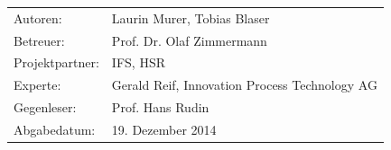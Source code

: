 \begin{titlepage}
	\vspace{80pt}	
	
	\begin{minipage}[b]{0.4\textwidth}
		\begin{flushleft}
			\begin{tabular}{ll}  
				Autoren: & Laurin Murer, Tobias Blaser \\ 
				Betreuer: & Prof. Dr. Olaf Zimmermann\\ 
				Projektpartner: & IFS, HSR\\
				Experte: & Gerald Reif, Innovation Process Technology AG\\
				Gegenleser: & Prof. Hans Rudin\\
				Abgabedatum: & 19. Dezember 2014\\
			\end{tabular}
		\end{flushleft}
	\end{minipage}	
\end{titlepage}
